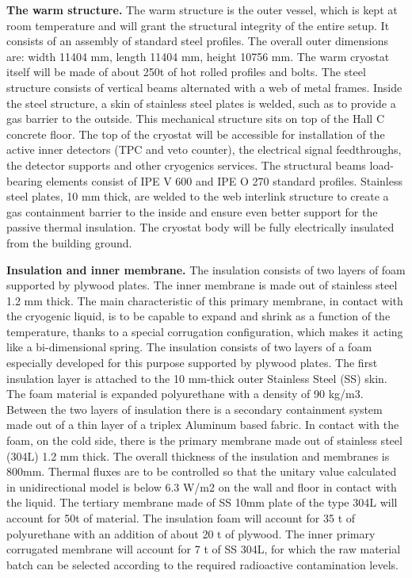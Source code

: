 {\bf The warm structure.} The warm structure is the outer vessel, which is kept at room
temperature and will grant the structural integrity of the entire setup. It consists of an
assembly of standard steel profiles. The overall outer dimensions are: width 11404 mm, length	
11404 mm, height 10756 mm. The warm cryostat itself will be made of about 250t of hot
rolled profiles and bolts. The steel structure consists of vertical beams alternated with a web
of metal frames. Inside the steel structure, a skin of stainless steel plates is welded, such as to
provide a gas barrier to the outside. This mechanical structure sits on top of the Hall C
concrete floor. The top of the cryostat will be accessible for installation of the active inner
detectors (TPC and veto counter), the electrical signal feedthroughs, the detector supports and
other cryogenics services. The structural beams load-bearing elements consist of IPE V 600
and IPE O 270 standard profiles. Stainless steel plates, 10 mm thick, are welded to the web
interlink structure to create a gas containment barrier to the inside and ensure even better
support for the passive thermal insulation. The cryostat body will be fully electrically
insulated from the building ground.

{\bf Insulation and inner membrane.} The insulation consists of two layers of foam supported by
plywood plates. The inner membrane is made out of stainless steel 1.2 mm thick. The main
characteristic of this primary membrane, in contact with the cryogenic liquid, is to be capable
to expand and shrink as a function of the temperature, thanks to a special corrugation
configuration, which makes it acting like a bi-dimensional spring. The insulation consists of
two layers of a foam especially developed for this purpose supported by plywood plates. The
first insulation layer is attached to the 10 mm-thick outer Stainless Steel (SS) skin. The foam
material is expanded polyurethane with a density of 90 kg/m3. Between the two layers of
insulation there is a secondary containment system made out of a thin layer of a triplex
Aluminum based fabric.
In contact with the foam, on the cold side, there is the primary membrane made out of
stainless steel (304L) 1.2 mm thick. The overall thickness of the insulation and membranes is
800mm. Thermal fluxes are to be controlled so that the unitary value calculated in
unidirectional model is below 6.3 W/m2 on the wall and floor in contact with the liquid.
The tertiary membrane made of SS 10mm plate of the type 304L will account for 50t of
material. The insulation foam will account for 35 t of polyurethane with an addition of about
20 t of plywood. The inner primary corrugated membrane will account for 7 t of SS 304L, for
which the raw material batch can be selected according to the required radioactive
contamination levels.

